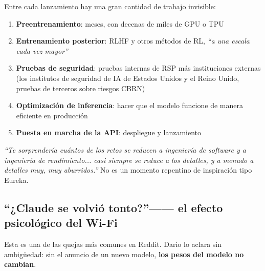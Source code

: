 \documentclass[a4paper]{article}
\begin{document}
Entre cada lanzamiento hay una gran cantidad de trabajo invisible:

\begin{enumerate}
    \item \textbf{Preentrenamiento}: meses, con decenas de miles de GPU o TPU
    \item \textbf{Entrenamiento posterior}: RLHF y otros métodos de RL, \textit{``a una escala cada vez mayor''}
    \item \textbf{Pruebas de seguridad}: pruebas internas de RSP más instituciones externas (los institutos de seguridad de IA de Estados Unidos y el Reino Unido, pruebas de terceros sobre riesgos CBRN)
    \item \textbf{Optimización de inferencia}: hacer que el modelo funcione de manera eficiente en producción
    \item \textbf{Puesta en marcha de la API}: despliegue y lanzamiento
\end{enumerate}

\textit{``Te sorprendería cuántos de los retos se reducen a ingeniería de software y a ingeniería de rendimiento... casi siempre se reduce a los detalles, y a menudo a detalles muy, muy aburridos.''} No es un momento repentino de inspiración tipo Eureka.

\subsection{``¿Claude se volvió tonto?''—— el efecto psicológico del Wi-Fi}

Esta es una de las quejas más comunes en Reddit. Dario lo aclara sin ambigüedad: sin el anuncio de un nuevo modelo, \textbf{los pesos del modelo no cambian}.
\end{document}

